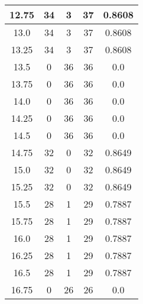 \documentclass[letterpaper, 12pt]{article}
\begin{document}
\begin{longtable}{|c|c|c|c|c|}
\hline
12.75 & 34 & 3 & 37 & 0.8608 \\
\hline
13.0 & 34 & 3 & 37 & 0.8608 \\
\hline
13.25 & 34 & 3 & 37 & 0.8608 \\
\hline
13.5 & 0 & 36 & 36 & 0.0 \\
\hline
13.75 & 0 & 36 & 36 & 0.0 \\
\hline
14.0 & 0 & 36 & 36 & 0.0 \\
\hline
14.25 & 0 & 36 & 36 & 0.0 \\
\hline
14.5 & 0 & 36 & 36 & 0.0 \\
\hline
14.75 & 32 & 0 & 32 & 0.8649 \\
\hline
15.0 & 32 & 0 & 32 & 0.8649 \\
\hline
15.25 & 32 & 0 & 32 & 0.8649 \\
\hline
15.5 & 28 & 1 & 29 & 0.7887 \\
\hline
15.75 & 28 & 1 & 29 & 0.7887 \\
\hline
16.0 & 28 & 1 & 29 & 0.7887 \\
\hline
16.25 & 28 & 1 & 29 & 0.7887 \\
\hline
16.5 & 28 & 1 & 29 & 0.7887 \\
\hline
16.75 & 0 & 26 & 26 & 0.0 \\
\hline
\end{longtable}
\end{document}

